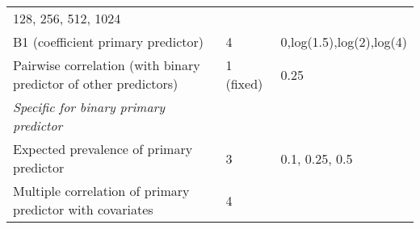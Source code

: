 \documentclass[10,a4paperpaper,]{article}
\begin{document}
\begin{longtable}[]{@{}lll@{}}
\begin{minipage}[t]{0.43\columnwidth}
128, 256, 512, 1024\strut
\end{minipage}\tabularnewline
\begin{minipage}[t]{0.37\columnwidth}\raggedright
B1 (coefficient primary predictor)\strut
\end{minipage} & \begin{minipage}[t]{0.12\columnwidth}\raggedright
4\strut
\end{minipage} & \begin{minipage}[t]{0.43\columnwidth}\raggedright
0,log(1.5),log(2),log(4)\strut
\end{minipage}\tabularnewline
\begin{minipage}[t]{0.37\columnwidth}\raggedright
Pairwise correlation (with binary predictor of other predictors)\strut
\end{minipage} & \begin{minipage}[t]{0.12\columnwidth}\raggedright
1 (fixed)\strut
\end{minipage} & \begin{minipage}[t]{0.43\columnwidth}\raggedright
0.25\strut
\end{minipage}\tabularnewline
\begin{minipage}[t]{0.37\columnwidth}\raggedright
\emph{Specific for binary primary predictor}\strut
\end{minipage} & \begin{minipage}[t]{0.12\columnwidth}\raggedright
\strut
\end{minipage} & \begin{minipage}[t]{0.43\columnwidth}\raggedright
\strut
\end{minipage}\tabularnewline
\begin{minipage}[t]{0.37\columnwidth}\raggedright
Expected prevalence of primary predictor\strut
\end{minipage} & \begin{minipage}[t]{0.12\columnwidth}\raggedright
3\strut
\end{minipage} & \begin{minipage}[t]{0.43\columnwidth}\raggedright
0.1, 0.25, 0.5\strut
\end{minipage}\tabularnewline
\begin{minipage}[t]{0.37\columnwidth}\raggedright
Multiple correlation of primary predictor with covariates\strut
\end{minipage} & \begin{minipage}[t]{0.12\columnwidth}\raggedright
4\strut
\end{minipage} & \begin{minipage}[t]{0.43\columnwidth}\raggedright

\end{minipage}
\end{longtable}
\end{document}
